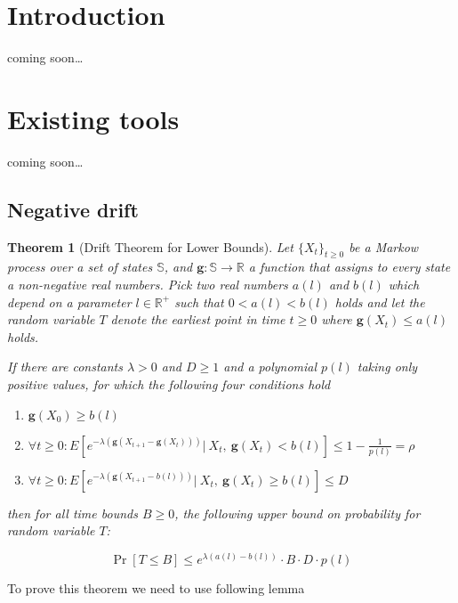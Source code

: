 \documentclass[12pt, a4paper]{article}
\title{\text{Additive drift with tail bounds}}
\author{Vihnin F.
    \and Antipov D.
    \and Sinyachenko N.}
\newcommand{\gfun}{\mathbf{g}}
\newtheorem{theorem}{Theorem}[section]
\theoremstyle{remark}
\newcommand{\cm}{coming soon\dots}
\begin{document}
\maketitle

\section{Introduction}
\cm

\section{Existing tools}
\cm
\subsection{Negative drift}
\begin{theorem}[Drift Theorem for Lower Bounds] \label{thm:neat}
    Let $\{X_t\}_{t \ge 0}$ be a Markow process over a set of states $\mathbb{S}$, and $\mathbf{g} : \mathbb{S} \rightarrow \mathbb{R}$ a function that assigns to every state a non-negative real numbers. Pick two real numbers $a(l)$ and $b(l)$ which depend on a parameter $l \in \mathbb{R}^+$ such that $0 < a(l) < b(l)$ holds and let the random variable $T$ denote
    the earliest point in time $t \ge 0$ where $\mathbf{g}(X_t) \leq a(l)$ holds.
    
    If there are constants $\lambda > 0$ and $D \ge 1$ and a polynomial $p(l)$ taking only positive values, for which the following four conditions hold

    \begin{enumerate}
        \item $\gfun(X_0) \ge b(l)$
        \item $\forall t \ge 0 : E[e^{-\lambda(\gfun(X_{t + 1} - \gfun(X_t)))} |\ X_t,\ \gfun(X_t) < b(l)] \leq 1 - \frac{1}{p(l)} = \rho$
        \item $\forall t \ge 0 : E[e^{-\lambda(\gfun(X_{t + 1} - b(l)))} |\ X_t,\ \gfun(X_t) \ge b(l)] \leq D$
    \end{enumerate}
    then for all time bounds $B \ge 0$, the following upper bound on probability for random variable $T$:

    \begin{equation}
        \Pr[T \leq B] \leq e^{\lambda(a(l) - b(l))} \cdot B \cdot D \cdot p(l)
    \end{equation}
\end{theorem}

To prove this theorem we need to use following lemma
\end{document}
